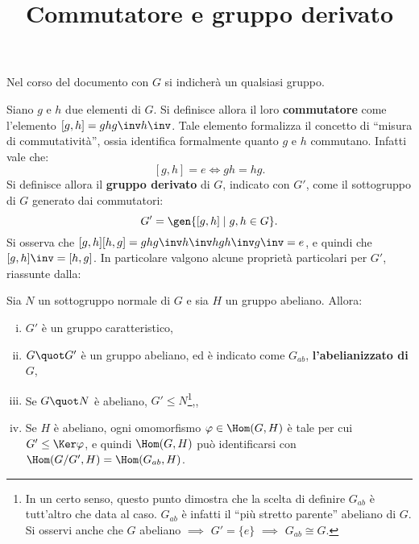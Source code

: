 \documentclass[12pt]{scrartcl}
\begin{document}
	\title{Commutatore e gruppo derivato}
	\maketitle
	
	\begin{note}
		Nel corso del documento con $G$ si indicherà un qualsiasi gruppo.
	\end{note}

	Siano $g$ e $h$ due elementi di $G$. Si definisce allora il loro \textbf{commutatore}
	come l'elemento $[g, h] = ghg\inv h\inv$. Tale elemento formalizza il concetto di
	``misura di commutatività'', ossia identifica formalmente quanto $g$ e $h$ commutano.
	Infatti vale che:
	\[ [g,h] = e \iff gh=hg. \]
	Si definisce allora il \textbf{gruppo derivato} di $G$, indicato con $G'$, come
	il sottogruppo di $G$ generato dai commutatori:
	\[ G' = \gen{[g, h] \mid g, h \in G}. \]
	Si osserva che $[g, h] [h, g] = ghg\inv h\inv hg h\inv g\inv = e$, e quindi
	che $[g, h]\inv = [h, g]$. In particolare valgono alcune proprietà particolari
	per $G'$, riassunte dalla:
	
	\begin{proposition}
		Sia $N$ un sottogruppo normale di $G$ e sia $H$ un gruppo abeliano. Allora:
		
		\begin{enumerate}[(i)]
			\item $G'$ è un gruppo caratteristico,
			\item $G \quot G'$ è un gruppo abeliano, ed è indicato come
			$G_{ab}$, \textbf{l'abelianizzato di $G$},
			\item Se $G \quot N$ è abeliano, $G' \leq N$\footnote{
				In un certo senso, questo punto dimostra che la scelta di definire
				$G_{ab}$ è tutt'altro che data al caso. $G_{ab}$ è infatti il ``più stretto
				parente'' abeliano di $G$. Si osservi anche che $G$ abeliano
				$\implies$ $G' = \{e\}$ $\implies$ $G_{ab} \cong G$. 
			},,
			\item Se $H$ è abeliano, ogni omomorfismo $\varphi \in \Hom(G, H)$ è
				tale per cui $G' \leq \Ker \varphi$, e quindi
				$\Hom(G, H)$ può identificarsi con $\Hom(G/G', H) =
				\Hom(G_{ab}, H)$.
		\end{enumerate}
	\end{proposition}
	
\end{document}
